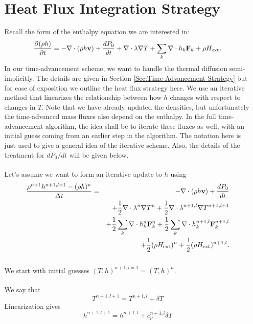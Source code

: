 \documentclass[final]{siamltex}
\def\Fb {{\bf F}}
\def\vb {{\bf v}}
\def\Hext {H_{\rm ext}}
\def\half   {\frac{1}{2}}
\begin{document}
\section{Heat Flux Integration Strategy}
Recall the form of the enthalpy equation we are interested in:
\begin{equation}
\frac{\partial(\rho h)}{\partial t} = -\nabla\cdot(\rho h\vb) + \frac{dP_0}{dt} + \nabla\cdot\lambda\nabla T + \sum_k\nabla\cdot h_k\Fb_k + \rho\Hext.
\end{equation}
In our time-advancement scheme, we want to handle the thermal diffusion semi-implicitly.
The details are given in Section {\ref{Sec:Time-Advancement Strategy}} but for ease
of exposition we outline the heat flux strategy here.
We use an iterative method that
linearizes the relationship between how $h$ changes with respect to changes in $T$.
Note that we have already updated the densities, but unfortunately the time-advanced
mass fluxes also depend on the enthalpy.  In the full time-advancement algorithm,
the idea shall be to iterate these fluxes as well, with an initial guess coming from
an earlier step in the algorithm.  The notation here is just used to give a general
idea of the iterative scheme.  Also, the details of the treatment for 
$dP_0/dt$ will be given below.\\ \\
Let's assume we want to form an iterative update to $h$ using
\begin{eqnarray}
\frac{\rho^{n+1}h^{n+1,l+1} - (\rho h)^n}{\Delta t} &=& -\nabla\cdot(\rho h\vb) + \frac{dP_0}{dt}\nonumber\\
&&+ \half\nabla\cdot\lambda^n\nabla T^n + \half\nabla\cdot\lambda^{n+1,l}\nabla T^{n+1,l+1}\nonumber\\
&& + \half\sum_k\nabla\cdot h_k^n \Fb_k^n + \half\sum_k\nabla\cdot h_k^{n+1,l}\Fb_k^{n+1,l}\nonumber\\
&& + \half(\rho\Hext)^n + \half(\rho\Hext)^{n+1,l}.\label{eq:temp form}
\end{eqnarray}
\\
We start with initial guesses $(T,h)^{n+1,l=1} = (T,h)^n$.\\ \\
We say that
\begin{equation}
T^{n+1,l+1} = T^{n+1,l} + \delta T\label{eq:delta T}
\end{equation}
Linearization gives
\begin{equation}
h^{n+1,l+1} = h^{n+1,l} + c_p^{n+1,l}\delta T\label{eq:delta h}
\end{equation}
\end{document}
